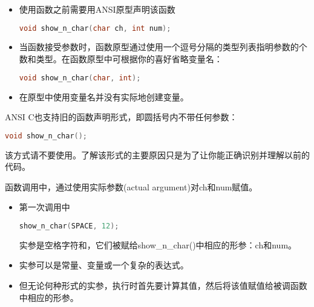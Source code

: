 \begin{frame}[fragile]
\begin{itemize}
\item
使用函数之前需要用ANSI原型声明该函数
\begin{lstlisting}[language=c,backgroundcolor=\color{red!10}]
void show_n_char(char ch, int num);
\end{lstlisting}
\vspace{0.1in}

\item
当函数接受参数时，函数原型通过使用一个逗号分隔的类型列表指明参数的个数和类型。在函数原型中可根据你的喜好省略变量名：
\begin{lstlisting}[language=c,backgroundcolor=\color{red!10}]
void show_n_char(char, int);
\end{lstlisting}
\vspace{0.1in}

\item
在原型中使用变量名并没有实际地创建变量。
\end{itemize}

\end{frame}

\begin{frame}[fragile]
ANSI C也支持旧的函数声明形式，即圆括号内不带任何参数：
\begin{lstlisting}[language=c,backgroundcolor=\color{red!10}]
void show_n_char();
\end{lstlisting}
该方式请不要使用。了解该形式的主要原因只是为了让你能正确识别并理解以前的代码。
\end{frame}

\begin{frame}[fragile]
函数调用中，通过使用实际参数{\tf (actual argument)}对{\tf ch}和{\tf num}赋值。
\begin{itemize}
\item
第一次调用中
\begin{lstlisting}[language=c,backgroundcolor=\color{red!10}]
show_n_char(SPACE, 12);
\end{lstlisting}
实参是空格字符和{}，它们被赋给{\tf show\_n\_char()}中相应的形参：{\tf ch}和{\tf num}。\\[0.1in]
\item \textcolor{acolor1}{实参可以是常量、变量或一个复杂的表达式。}\\[0.1in]
\item 但无论何种形式的实参，执行时首先要计算其值，然后将该值赋值给被调函数中相应的形参。
\end{itemize}
\end{frame}

